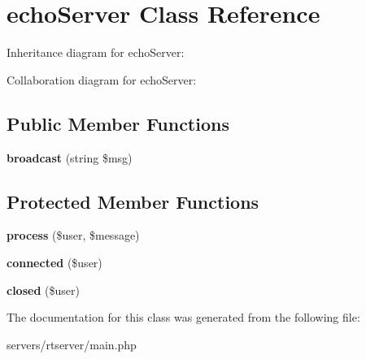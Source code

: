 \hypertarget{classecho_server}{}\section{echo\+Server Class Reference}
\label{classecho_server}


Inheritance diagram for echo\+Server\+:


Collaboration diagram for echo\+Server\+:
\subsection*{Public Member Functions}
\begin{DoxyCompactItemize}
\item 
\mbox{\label{classecho_server_a473114c92843eda7de537f42ffde8913}} 
{\bfseries broadcast} (string \$msg)
\end{DoxyCompactItemize}
\subsection*{Protected Member Functions}
\begin{DoxyCompactItemize}
\item 
\mbox{\label{classecho_server_a805b6933fa0b69978e35fe94f3884de7}} 
{\bfseries process} (\$user, \$message)
\item 
\mbox{\label{classecho_server_a3e89014762456a67edbe843811c78736}} 
{\bfseries connected} (\$user)
\item 
\mbox{\label{classecho_server_aaf6375ec8ee41584a5adcf3d85d73018}} 
{\bfseries closed} (\$user)
\end{DoxyCompactItemize}


The documentation for this class was generated from the following file\+:\begin{DoxyCompactItemize}
\item 
servers/rtserver/main.\+php\end{DoxyCompactItemize}
